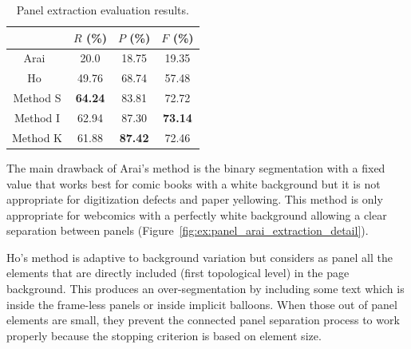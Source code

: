   \begin{table}[ht]
    \normalsize

    \centering
    \caption[Panel extraction evaluation results]{Panel extraction evaluation results.}
    \begin{tabular}{|c|c|c|c|}
          \hline
          &  $R$ (\%)  & $P$ (\%)  & $F$ (\%)     \\
          \hline
          Arai~\cite{Arai11}   & 20.0       & 18.75    & 19.35    \\
          \hline
          Ho~\cite{Ho2012}   & 49.76       & 68.74    & 57.48    \\
          \hline
          Method S          & \textbf{64.24}       & 83.81   & 72.72     \\
          \hline
          Method I          & 62.94       & 87.30   & \bf{73.14}      \\
          \hline
          Method K          & 61.88       & \textbf{87.42}     & 72.46      \\
          \hline
        \end{tabular}
    \label{tab:panel_extraction_comparision_results}
  \end{table}%


The main drawback of Arai's method is the binary segmentation with a fixed value that works best for comic books with a white background but it is not appropriate for digitization defects and paper yellowing.
This method is only appropriate for webcomics with a perfectly white background allowing a clear separation between panels (Figure~\ref{fig:ex:panel_arai_extraction_detail}).

Ho's method is adaptive to background variation but considers as panel all the elements that are directly included (first topological level) in the page background.
This produces an over-segmentation by including some text which is inside the frame-less panels or inside implicit balloons.
When those out of panel elements are small, they prevent the connected panel separation process to work properly because the stopping criterion is based on element size.

